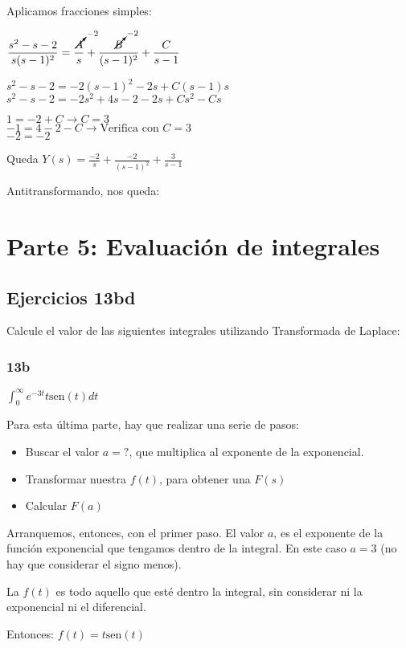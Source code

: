 \documentclass[11pt]{article}
\def\sen{\mathrm{sen}}
\begin{document}
	Aplicamos fracciones simples:
	
	$\displaystyle \frac{s^2-s-2}{s(s-1)^2}=\frac{\cancelto{-2}{A}}{s}+\frac{\cancelto{-2}{B}}{(s-1)^2}+\frac{C}{s-1}$
	
	$\displaystyle s^2-s-2=-2(s-1)^2-2s+C(s-1)s$\\
	$\displaystyle s^2-s-2=-2s^2+4s-2-2s+Cs^2-Cs$
	
	$\displaystyle 1=-2+C \rightarrow C=3$\\
	$-1=4-2-C \rightarrow \text{Verifica con } C=3$\\
	$-2=-2$
	
	Queda $\displaystyle Y(s)=\frac{-2}{s}+\frac{-2}{(s-1)^2}+\frac{3}{s-1}$
	
	Antitransformando, nos queda: 
	
	\section{Parte 5: Evaluación de integrales}
	\subsection{Ejercicios 13bd}
	Calcule el valor de las siguientes integrales utilizando Transformada de Laplace:
	
	\subsubsection{13b}
	$\displaystyle \int_{0}^{\infty}e^{-3t}t\sen(t)dt$
	
	Para esta última parte, hay que realizar una serie de pasos:
	\begin{itemize}
		\item Buscar el valor $a=?$, que multiplica al exponente de la exponencial.
		\item Transformar nuestra $f(t)$, para obtener una $F(s)$
		\item Calcular $F(a)$
	\end{itemize}

	Arranquemos, entonces, con el primer paso. El valor $a$, es el exponente de la función exponencial que tengamos dentro de la integral. En este caso $a=3$ (no hay que considerar el signo menos).
	
	La $f(t)$ es todo aquello que esté dentro la integral, sin considerar ni la exponencial ni el diferencial.
	
	Entonces: $f(t)=t\sen(t)$
	
\end{document}
